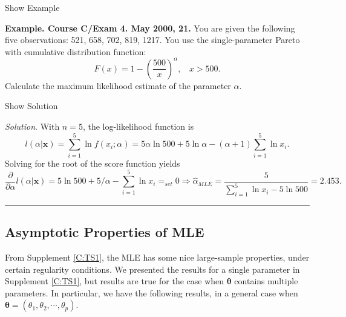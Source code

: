 \documentclass[]{book}
\theoremstyle{definition}
\theoremstyle{definition}
\theoremstyle{definition}
\theoremstyle{remark}
\begin{document}
Show Example

\hypertarget{EXM:S2b:MLE}{}
\textbf{Example. Course C/Exam 4. May 2000, 21.} You are given the
following five observations: 521, 658, 702, 819, 1217. You use the
single-parameter Pareto with cumulative distribution function:
\[F(x) = 1- \left(\frac{500}{x}\right)^{\alpha}, ~~~~ x>500 .\]
Calculate the maximum likelihood estimate of the parameter \(\alpha\).

Show Solution

\hypertarget{SOL:S2b:MLE}{}
\emph{Solution}. With \(n=5\), the log-likelihood function is
\[l(\alpha|\mathbf{x} ) =  \sum_{i=1}^5 \ln f(x_i;\alpha ) =  5 \alpha \ln 500 + 5 \ln \alpha
-(\alpha+1) \sum_{i=1}^5 \ln x_i.\] Solving for the root of the score
function yields
\[\frac{ \partial}{\partial \alpha } l(\alpha |\mathbf{x}) =    5  \ln 500 + 5 / \alpha -  \sum_{i=1}^5 \ln x_i
=_{set} 0 \Rightarrow \hat{\alpha}_{MLE} = \frac{5}{\sum_{i=1}^5 \ln x_i - 5  \ln 500 } = 2.453 .\]

\begin{center}\rule{0.5\linewidth}{\linethickness}\end{center}

\subsection{Asymptotic Properties of
MLE}\label{asymptotic-properties-of-mle}

From Supplement \ref{C:TS1}, the MLE has some nice large-sample
properties, under certain regularity conditions. We presented the
results for a single parameter in Supplement \ref{C:TS1}, but results
are true for the case when \(\boldsymbol{\theta}\) contains multiple
parameters. In particular, we have the following results, in a general
case when \(\boldsymbol{\theta}=(\theta_1,\theta_2,\cdots,\theta_p)\).
\end{document}

